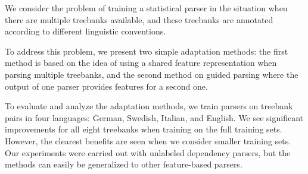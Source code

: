 We consider the problem of training a statistical parser in the situation when there are multiple treebanks available, and these
 treebanks are annotated according to different linguistic
 conventions. 
 
 To address this problem, we present two simple adaptation methods:
 the first method is based on the idea of using a shared feature
 representation when parsing multiple treebanks, and the second method
 on guided parsing where the output of one parser provides features
 for a second one.
 
 To evaluate and analyze the adaptation methods, we train parsers
 on treebank pairs in four languages: German, Swedish, Italian, and English.
 We see significant improvements for all eight treebanks when training
 on the full training sets. However, the clearest benefits are seen when we
 consider smaller training sets. Our experiments were carried out with
 unlabeled dependency parsers, but the methods can easily be 
 generalized to other feature-based parsers.


